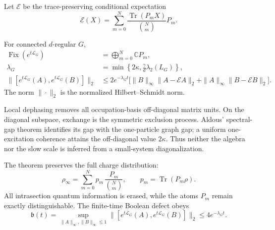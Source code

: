 Let \(\mathcal E\) be the trace-preserving conditional expectation
\begin{equation}
 \mathcal E(X)=\sum_{m=0}^{N}
 \frac{\operatorname{Tr}(P_mX)}{\binom Nm}P_m .
 \label{eq:loop-boolean-expectation}
\end{equation}

\begin{theorem}
\label{thm:loop-boolean}
For connected \(d\)-regular \(G\),
\begin{align}
 \operatorname{Fix}(e^{t\mathcal L_G})
 &=\bigoplus_{m=0}^{N}\mathbb CP_m,\nonumber\\
 \lambda_G&=\min\!\left\{2\kappa,
 \frac{\gamma}{d}\lambda_2(L_G)\right\},
 \label{eq:loop-boolean-gap}\\
 \|[e^{t\mathcal L_G}(A),e^{t\mathcal L_G}(B)]\|_2
 &\le 2e^{-\lambda_Gt}
 \bigl[\|B\|_\infty\|A-\mathcal EA\|_2
 +\|A\|_\infty\|B-\mathcal EB\|_2\bigr].
 \label{eq:loop-boolean-comm}
\end{align}
The norm \(\|\cdot\|_2\) is the normalized Hilbert--Schmidt norm.
\end{theorem}

Local dephasing removes all occupation-basis off-diagonal matrix units.
On the diagonal subspace, exchange is the symmetric exclusion process.
Aldous' spectral-gap theorem identifies its gap with the one-particle graph
gap; a uniform one-excitation coherence attains the off-diagonal value
\(2\kappa\).  Thus neither the algebra nor the slow scale is inferred from a
small-system diagonalization.

The theorem preserves the full charge distribution:
\begin{equation}
 \rho_\infty=\sum_{m=0}^{N}
 p_m\,\frac{P_m}{\binom Nm},
 \qquad p_m=\operatorname{Tr}(P_m\rho).
 \label{eq:loop-boolean-state}
\end{equation}
All intrasection quantum information is erased, while the atoms \(P_m\)
remain exactly distinguishable.  The finite-time Boolean defect obeys
\begin{equation}
 \mathfrak b(t)=
 \sup_{\|A\|_\infty,\|B\|_\infty\le1}
 \|[e^{t\mathcal L_G}(A),e^{t\mathcal L_G}(B)]\|_2
 \le4e^{-\lambda_Gt}.
 \label{eq:loop-boolean-defect}
\end{equation}

